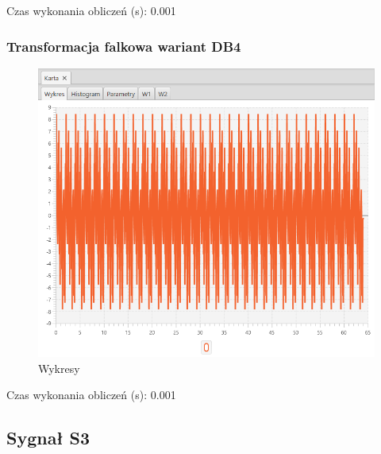 \documentclass[12pt]{article}
\begin{document}
{{{                Czas wykonania obliczeń (s): 0.001
            }
            \newpage

            \subsubsection{Transformacja falkowa wariant DB4} {

                \begin{figure}[H]
                    \centering
                    \includegraphics[width=\textwidth]{img/result/s2/08/data_draw_8_sinus_sampling_trans_s2_data_205848.png}
                    \caption{Wykresy}
                \end{figure}

                Czas wykonania obliczeń (s): 0.001
            }
            \newpage

        }
        \newpage
        \subsection{Sygnał S3} {

}}
\end{document}
